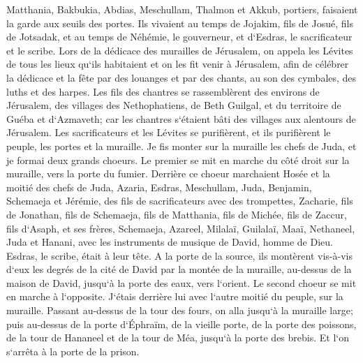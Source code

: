 \verse Matthania, Bakbukia, Abdias, Meschullam, Thalmon et Akkub, portiers, faisaient la garde aux seuils des portes. 
\verse Ils vivaient au temps de Jojakim, fils de Josué, fils de Jotsadak, et au temps de Néhémie, le gouverneur, et d`Esdras, le sacrificateur et le scribe. 
\verse Lors de la dédicace des murailles de Jérusalem, on appela les Lévites de tous les lieux qu`ils habitaient et on les fit venir à Jérusalem, afin de célébrer la dédicace et la fête par des louanges et par des chants, au son des cymbales, des luths et des harpes. 
\verse Les fils des chantres se rassemblèrent des environs de Jérusalem, des villages des Nethophatiens, 
\verse de Beth Guilgal, et du territoire de Guéba et d`Azmaveth; car les chantres s`étaient bâti des villages aux alentours de Jérusalem. 
\verse Les sacrificateurs et les Lévites se purifièrent, et ils purifièrent le peuple, les portes et la muraille. 
\verse Je fis monter sur la muraille les chefs de Juda, et je formai deux grands choeurs. Le premier se mit en marche du côté droit sur la muraille, vers la porte du fumier. 
\verse Derrière ce choeur marchaient Hosée et la moitié des chefs de Juda, 
\verse Azaria, Esdras, Meschullam, 
\verse Juda, Benjamin, Schemaeja et Jérémie, 
\verse des fils de sacrificateurs avec des trompettes, Zacharie, fils de Jonathan, fils de Schemaeja, fils de Matthania, fils de Michée, fils de Zaccur, fils d`Asaph, 
\verse et ses frères, Schemaeja, Azareel, Milalaï, Guilalaï, Maaï, Nethaneel, Juda et Hanani, avec les instruments de musique de David, homme de Dieu. Esdras, le scribe, était à leur tête. 
\verse A la porte de la source, ils montèrent vis-à-vis d`eux les degrés de la cité de David par la montée de la muraille, au-dessus de la maison de David, jusqu`à la porte des eaux, vers l`orient. 
\verse Le second choeur se mit en marche à l`opposite. J`étais derrière lui avec l`autre moitié du peuple, sur la muraille. Passant au-dessus de la tour des fours, on alla jusqu`à la muraille large; 
\verse puis au-dessus de la porte d`Éphraïm, de la vieille porte, de la porte des poissons, de la tour de Hananeel et de la tour de Méa, jusqu`à la porte des brebis. Et l`on s`arrêta à la porte de la prison. 

